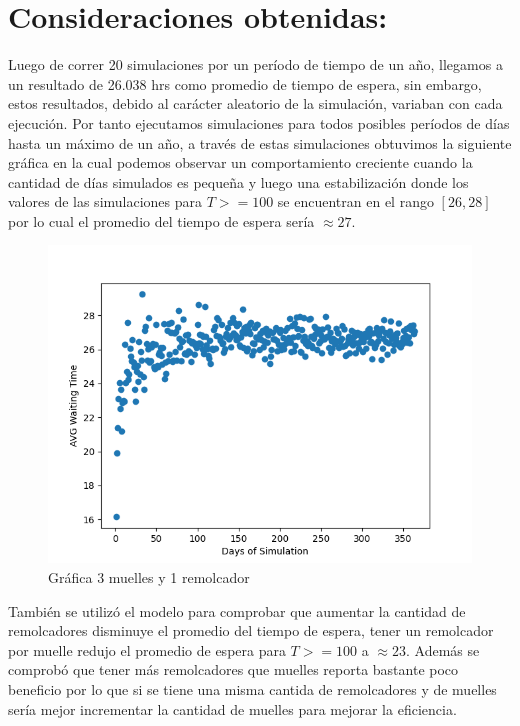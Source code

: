 \documentclass[titlepage,11pt]{scrartcl}
\begin{document}
\section{Consideraciones obtenidas:}

	Luego de correr 20 simulaciones por un per\'iodo de tiempo de un a\~no, llegamos a un resultado de 26.038 hrs como
	promedio de tiempo de espera, sin embargo, estos resultados, debido al car\'acter aleatorio de la simulaci\'on, variaban con cada ejecuci\'on.
	Por tanto ejecutamos simulaciones para todos posibles per\'iodos de d\'ias hasta un m\'aximo de un a\~no, a trav\'es de estas 
	simulaciones obtuvimos la siguiente gr\'afica en la cual podemos observar un comportamiento creciente cuando la cantidad de d\'ias simulados 
	es peque\~na y luego una estabilizaci\'on donde los valores de las simulaciones para $T >= 100$ se encuentran en el rango $[26,28]$ por lo cual el promedio del tiempo de espera ser\'ia $\approx 27$.
	
	\begin{figure}[htb]
		\begin{center}
			\includegraphics[width=\columnwidth]{./g.png}
		\end{center}
		\caption{Gr\'afica 3 muelles y 1 remolcador}
	\end{figure}

	Tambi\'en se utiliz\'o el modelo para comprobar que aumentar la cantidad de remolcadores disminuye el promedio del tiempo de espera, tener un remolcador por muelle redujo el promedio de espera para $T >= 100$ a $\approx 23$. Adem\'as se comprob\'o que tener m\'as remolcadores que
	muelles reporta bastante poco beneficio por lo que si se tiene una misma cantida de remolcadores y de muelles ser\'ia mejor incrementar la cantidad de muelles para mejorar la eficiencia.
\end{document}
